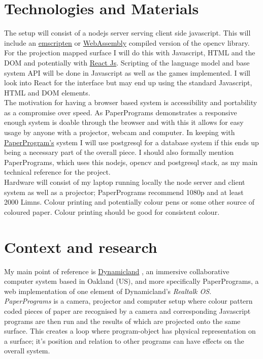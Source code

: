 \documentclass[11pt]{article}
\begin{document}
\section*{Technologies and Materials}
\label{sec:orgc19dab9}

The setup will consist of a nodejs server serving client side javascript. This will include an \href{https://docs.opencv.org/3.4/d4/da1/tutorial\_js\_setup.html}{emscripten} or \href{https://webassembly.org/}{WebAssembly} compiled version of the opencv library. For the projection mapped surface I will do this with Javascript, HTML and the DOM and potentially with \href{https://reactjs.org/}{React Js}. Scripting of the language model and base system API will be done in Javascript as well as the games implemented. I will look into React for the interface but may end up using the standard Javascript, HTML and DOM elements.\\

The motivation for having a browser based system is accessibility and portability as a compromise over speed. As PaperPrograms demonstrates a responsive enough system is doable through the browser and with this it allows for easy usage by anyone with a projector, webcam and computer. In keeping with \href{https://paperprograms.org/}{PaperProgram's} system I will use postgresql for a database system if this ends up being a necessary part of the overall piece. I should also formally mention PaperPrograms, which uses this nodejs, opencv and postgresql stack, as my main technical reference for the project.\\

Hardware will consist of my laptop running locally the node server and client system as well as a projector; PaperPrograms recommend 1080p and at least 2000 Limns. Colour printing and potentially colour pens or some other source of coloured paper. Colour printing should be good for consistent colour.\\

\section*{Context and research}
\label{sec:org00d76ea}

My main point of reference is \href{https://dynamicland.org}{Dynamicland} \cite{VictorKayDynamicLand}, an immersive collaborative computer system based in Oakland (US), and more specifically PaperPrograms, a web implementation of one element of Dynamicland's \emph{Realtalk OS}. \emph{PaperPrograms} is a camera, projector and computer setup where colour pattern coded  pieces of paper are recognised by a camera and corresponding Javascript programs are then run and the results of which are projected onto the same surface. This creates a loop where program-object has physical representation on a surface; it's position and relation to other programs can have effects on the overall system.\\
\end{document}

